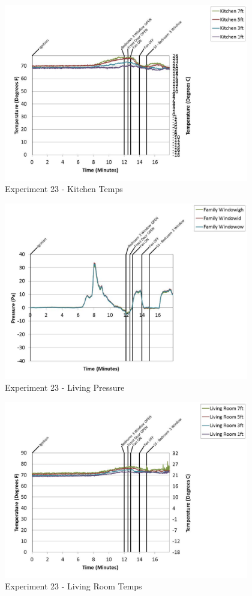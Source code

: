 \documentclass{article}
\begin{document}
\begin{appendices}
	\begin{figure}[h!]
		\centering
		\includegraphics[height=3.05in]{0_Images/Results_Charts/Exp_23_Charts/KitchenTemps.pdf}
		\caption{Experiment 23 - Kitchen Temps}
	\end{figure}
 
	\clearpage

	\begin{figure}[h!]
		\centering
		\includegraphics[height=3.05in]{0_Images/Results_Charts/Exp_23_Charts/LivingPressure.pdf}
		\caption{Experiment 23 - Living Pressure}
	\end{figure}
 

	\begin{figure}[h!]
		\centering
		\includegraphics[height=3.05in]{0_Images/Results_Charts/Exp_23_Charts/LivingRoomTemps.pdf}
		\caption{Experiment 23 - Living Room Temps}
	\end{figure}
 

\end{appendices}
\end{document}

